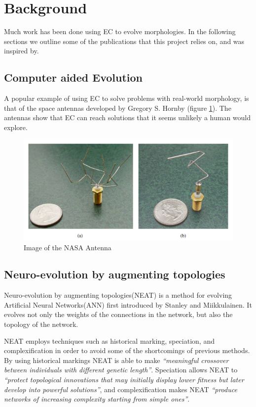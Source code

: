 \section{Background}
Much work has been done using EC to evolve morphologies. In the following
sections we outline some of the publications that this project relies on, and
was inspired by.

\subsection{Computer aided Evolution}
A popular example of using EC to solve problems with real-world
morphology, is that of the space antennas developed by Gregory S.
Hornby\cite{paper:ev4} (figure \ref{fig:nasa_antenna}). The antennas show that
EC can reach solutions that it seems unlikely a human would explore.

\begin{figure}[ht] \includegraphics[scale=.7]{content/img/space_antenna}
\caption{Image of the NASA Antenna \cite{paper:ev4}}
\label{fig:nasa_antenna}
\end{figure}

\subsection{Neuro-evolution by augmenting topologies}
Neuro-evolution by augmenting topologies(NEAT) is a method for evolving 
Artificial Neural Networks(ANN) first introduced by Stanley and 
Miikkulainen\cite{stanley2002evolving}.
It evolves not only the weights of the connections in the network, but also the 
topology of the network.

NEAT employs techniques such as historical marking, speciation, and 
complexification in order to avoid some of the shortcomings of previous methods.
By using historical markings NEAT is able to make \emph{``meaningful crossover 
between individuals with different
genetic length''}\cite[p.~50]{Floreano2008}.
Speciation allows NEAT to \emph{``protect topological innovations
that may initially display lower fitness but later
develop into powerful solutions''}\cite[p.~50]{Floreano2008}, and complexification 
makes NEAT \emph{``produce networks of increasing complexity
starting from simple ones''}\cite[p.~50]{Floreano2008}.

